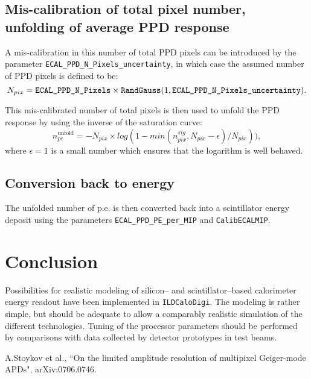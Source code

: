 \documentclass[12pt]{article} %
\begin{document}
\subsection*{Mis-calibration of total pixel number, unfolding of average PPD response}
A mis-calibration in this number of 
total PPD pixels can be introduced by the parameter {\tt ECAL\_PPD\_N\_Pixels\_uncertainty}, in which
case the assumed number of PPD pixels is defined to be:
\begin{equation*}
N_{pix} = \text{\tt ECAL\_PPD\_N\_Pixels} \times 
\text{\tt RandGauss}(1, \text{\tt ECAL\_PPD\_N\_Pixels\_uncertainty}).
\end{equation*}

This mis-calibrated number of total pixels is then used to 
unfold the PPD response by using the inverse of the saturation curve:
\begin{equation*}
n_{pe}^\text{unfold} = - N_{pix} \times log ( 1 - min ( n_{pix}^{sig}, N_{pix}-\epsilon) / N_{pix} ) ),
\end{equation*}
where $\epsilon = 1$ is a small number which ensures that the logarithm is well behaved.

\subsection*{Conversion back to energy}
The unfolded number of p.e. is then converted back into a scintillator energy deposit using the parameters
{\tt ECAL\_PPD\_PE\_per\_MIP}
and 
{\tt CalibECALMIP}.

\section{Conclusion}
Possibilities for realistic modeling of silicon-- and scintillator--based calorimeter  energy readout have been
implemented in {\tt ILDCaloDigi}. The modeling is rather simple, but should be adequate to allow 
a comparably realistic simulation of the different technologies. 
Tuning of the processor parameters
should be performed by comparisons with data collected by detector prototypes in test beams.

\begin{thebibliography}{99}
A.Stoykov et al., ``On the limited amplitude resolution of multipixel Geiger-mode APDs", arXiv:0706.0746.
\end{thebibliography}
\end{document}
